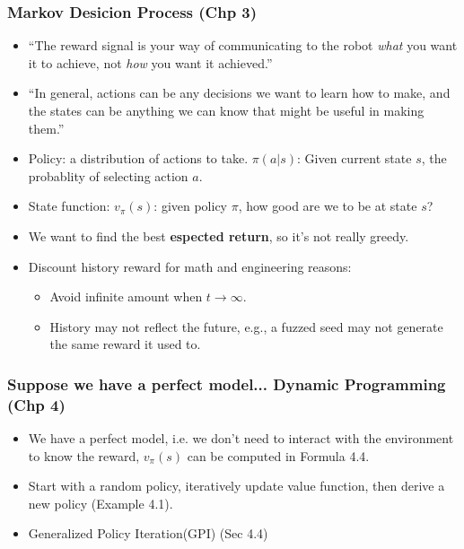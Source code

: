 \begin{frame}
    \frametitle{Markov Desicion Process (Chp 3)}
    \begin{itemize}
        \item ``The reward signal is your way of communicating to the robot \textit{what} you want it to achieve, not \textit{how} you want it achieved.''
        \item ``In general, actions can be any decisions we want to learn how to make, and the states can be anything we can know that might be useful in making them.''
        \item Policy: a distribution of actions to take. $\pi(a|s)$: Given current state $s$, the probablity of selecting action $a$.
        \item State function: $v_\pi(s)$: given policy $\pi$, how good are we to be at state $s$?
        \item We want to find the best \textbf{espected return}, so it's not really greedy.
        \item Discount history reward for math and engineering reasons:
              \begin{itemize}
                  \item Avoid infinite amount when $t\rightarrow\infty$.
                  \item History may not reflect the future, e.g., a fuzzed seed may not generate the same reward it used to.
              \end{itemize}
    \end{itemize}
\end{frame}

\begin{frame}
    \frametitle{Suppose we have a perfect model... Dynamic Programming (Chp 4)}
    \begin{itemize}
        \item We have a perfect model, i.e. we don't need to interact with the environment to know the reward, $v_\pi(s)$ can be computed in Formula 4.4.
        \item Start with a random policy, iteratively update value function, then derive a new policy (Example 4.1).
        \item Generalized Policy Iteration(GPI) (Sec 4.4)
    \end{itemize}
\end{frame}

